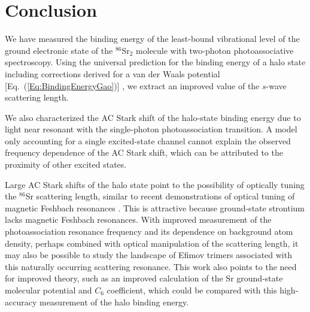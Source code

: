 \chapter{Conclusion}
\label{ch:conclusion}

We have measured the binding energy of the least-bound vibrational level of the ground electronic state of the $^{86}$Sr$_2$ molecule with two-photon photoassociative spectroscopy. Using the universal prediction for the binding energy of a halo state including corrections derived for a van der Waals potential [Eq.\ (\ref{Eq:BindingEnergyGao})] \cite{gfl93,gao01,gao04}, we extract an improved value of the $s$-wave scattering length.

We also characterized the AC Stark shift of the halo-state binding energy due to light near resonant with the single-photon photoassociation transition. A model only accounting for a single excited-state channel \cite{bju96} cannot explain the observed frequency dependence of the AC Stark shift, which can be attributed to the proximity of other excited states.

Large AC Stark shifts of the halo state point to the possibility of optically tuning the $^{86}$Sr scattering length, similar to recent demonstrations of optical tuning of magnetic Feshbach resonances \cite{blv09,chx15}. This is attractive because ground-state strontium lacks magnetic Feshbach resonances. With improved measurement of the photoassociation resonance frequency and its dependence on background atom density, perhaps combined with optical manipulation of the scattering length, it may also be possible to study the landscape of Efimov trimers associated with this naturally occurring scattering resonance. This work also points to the need for improved theory, such as an improved calculation of the Sr ground-state molecular potential and $C_6$ coefficient, which could be compared with this high-accuracy measurement of the halo binding energy.





